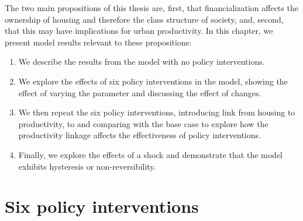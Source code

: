 The two main propositions of this thesis are, first, that financialization affects the ownership of housing and therefore the class structure of society, and, second, that this may have implications for urban productivity.  In this chapter, we present model results relevant to these propositions:  
\begin{enumerate}
    \item %
    We describe the results from the model with no policy interventions. 
    \item We explore the effects of six policy interventions in the model, %
    showing the effect of varying the parameter and discussing the effect of changes. 
    \item %
    We then repeat the six policy interventions, introducing link from housing to productivity, to and comparing with the base case to explore how the productivity linkage affects the effectiveness of policy interventions. %
     \item Finally, we explore the effects of a shock %
     and demonstrate that the model exhibits \gls{hysteresis} or non-reversibility.
     
\end{enumerate}



\section{Six policy interventions}

